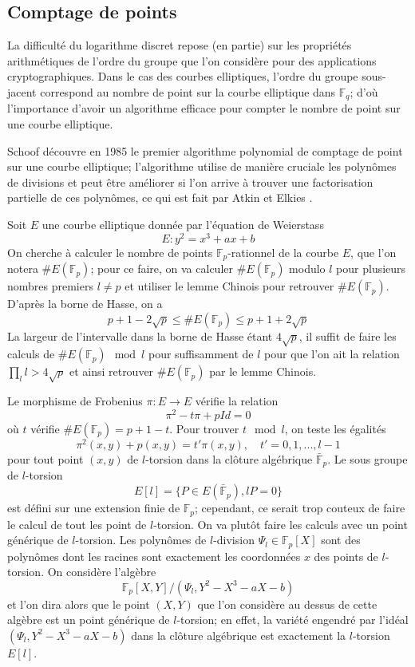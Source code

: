 \documentclass[a4paper]{article}
\theoremstyle{definition}
\theoremstyle{remark}
\numberwithin{equation}{section}
\begin{document}
\subsection{Comptage de points}
La difficulté du logarithme discret repose (en partie) sur les propriétés arithmétiques de l'ordre du groupe que l'on considère pour des applications cryptographiques. Dans le cas des courbes elliptiques, l'ordre du groupe sous-jacent correspond au nombre de point sur la courbe elliptique dans $\mathbb{F}_q$; d'où l'importance d'avoir un algorithme efficace pour compter le nombre de point sur une courbe elliptique.

Schoof \cite{schoof} découvre en 1985 le premier algorithme polynomial de comptage de point sur une courbe elliptique; l'algorithme utilise de manière cruciale les polynômes de divisions et peut être améliorer si l'on arrive à trouver une factorisation partielle de ces polynômes, ce qui est fait par Atkin \cite{atkin} et Elkies \cite{elkies}.

Soit $E$ une courbe elliptique donnée par l'équation de Weierstass $$E : y^2 = x^3 + ax + b$$
On cherche à calculer le nombre de points $\mathbb{F}_p$-rationnel de la courbe $E$, que l'on notera $\#E(\mathbb{F}_p)$; pour ce faire, on va calculer $\#E(\mathbb{F}_p)$ modulo $l$ pour plusieurs nombres premiers $l \neq p$ et utiliser le lemme Chinois pour retrouver $\#E(\mathbb{F}_p)$. D'après la borne de Hasse, on a
$$p+1 - 2\sqrt{p} \leq \#E(\mathbb{F}_p) \leq p+1 + 2\sqrt{p}$$
La largeur de l'intervalle dans la borne de Hasse étant $4\sqrt{p}$, il suffit de faire les calculs de $\#E(\mathbb{F}_p) \mod l$ pour suffisamment de $l$ pour que l'on ait la relation $\prod_l l > 4\sqrt{p}$ et ainsi retrouver $\#E(\mathbb{F}_p)$ par le lemme Chinois.

Le morphisme de Frobenius $\pi : E \longrightarrow E$ vérifie la relation
$$\pi^2 - t\pi + pId = 0$$
où $t$ vérifie $\#E(\mathbb{F}_p) = p + 1 - t$. Pour trouver $t \mod l$, on teste les égalités
$$\pi^2(x,y) + p(x,y) = t'\pi(x,y), \quad t' = 0,1,...,l-1$$
pour tout point $(x,y)$ de $l$-torsion dans la clôture algébrique $\bar{\mathbb{F}}_p$. Le sous groupe de $l$-torsion
$$E[l] = \{P \in E(\bar{\mathbb{F}}_p), lP = 0\}$$
est défini sur une extension finie de $\mathbb{F}_p$; cependant, ce serait trop couteux de faire le calcul de tout les point de $l$-torsion. On va plutôt faire les calculs avec un point générique de $l$-torsion. Les polynômes de $l$-division $\Psi_l \in \mathbb{F}_p[X]$ sont des polynômes dont les racines sont exactement les coordonnées $x$ des points de $l$-torsion. On considère l'algèbre $$\mathbb{F}_p[X,Y]/(\Psi_l,Y^2-X^3-aX-b)$$
et l'on dira alors que le point $(X,Y)$ que l'on considère au dessus de cette algèbre est un point générique de $l$-torsion; en effet, la variété engendré par l'idéal $(\Psi_l,Y^2-X^3-aX-b)$ dans la clôture algébrique est exactement la $l$-torsion $E[l]$.
\end{document}
